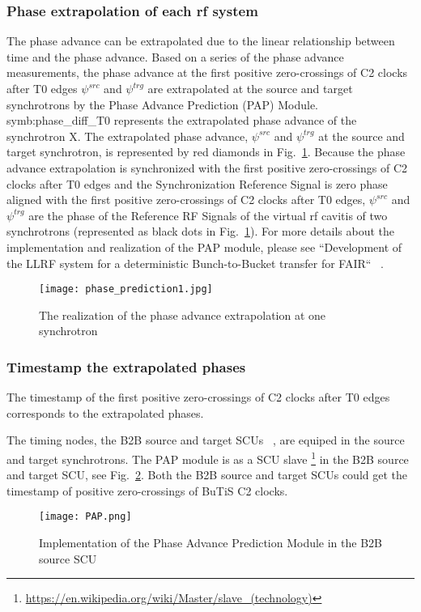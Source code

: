 \subsubsection{Phase extrapolation of each rf system}
The phase advance can be extrapolated due to the linear relationship between time and the phase advance. Based on a series of the phase advance measurements, the phase advance at the first positive zero-crossings of C2 clocks after T0 edges $\psi^\mathit{src}$ and $\psi^\mathit{trg}$ are extrapolated at the source and target synchrotrons by the Phase Advance Prediction (\gls{PAP}) Module.  \gls{symb:phase_diff_T0} represents the extrapolated phase advance of the synchrotron X. The extrapolated phase advance, $\psi^\mathit{src}$ and $\psi^\mathit{trg}$ at the source and target synchrotron, is represented by red diamonds in Fig.~\ref{phase_prediction1}. Because the phase advance extrapolation is synchronized with the first positive zero-crossings of C2 clocks after T0 edges and the Synchronization Reference Signal is zero phase aligned with the first positive zero-crossings of C2 clocks after T0 edges, $\psi^\mathit{src}$ and $\psi^\mathit{trg}$ are the phase of the Reference RF Signals of the virtual rf cavitis of two synchrotrons (represented as black dots in Fig.~\ref{phase_prediction1}). For more details about the implementation and realization of the PAP module, please see ``Development of the LLRF system for a deterministic Bunch-to-Bucket transfer for FAIR`` ~\cite{ferrand_development_????}.   
\begin{figure}[!htb]
   \centering   
   \texttt{[image: phase\_prediction1.jpg]}
   \caption{The realization of the phase advance extrapolation at one synchrotron}
   \label{phase_prediction1}
\end{figure}
\subsubsection{Timestamp the extrapolated phases}
The timestamp of the first positive zero-crossings of C2 clocks after T0 edges corresponds to the extrapolated phases. 

The timing nodes, the B2B source and target SCUs ~\cite{beck_new_2012, thieme_scu_2013}, are equiped in the source and target synchrotrons. The PAP module is as a SCU slave \footnote{\url{https://en.wikipedia.org/wiki/Master/slave_(technology)}} in the B2B source and target SCU, see Fig.~\ref{PAP}. Both the B2B source and target SCUs could get the timestamp of positive zero-crossings of \gls{BuTiS} C2 clocks. 
 \begin{figure}[!htb]
   \centering   
   \texttt{[image: PAP.png]}
   \caption{Implementation of the Phase Advance Prediction Module in the B2B source SCU}
   \label{PAP}
\end{figure}

